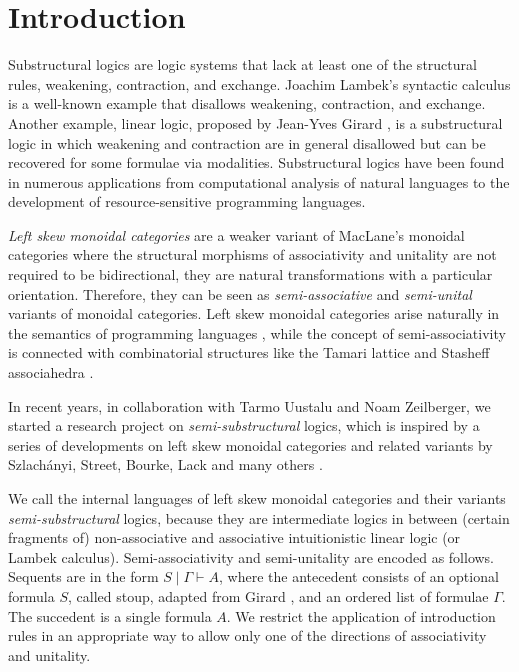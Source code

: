 \documentclass[sn-mathphys-num]{sn-jnl}%
\theoremstyle{thmstyleone}%
\theoremstyle{thmstyletwo}%
\theoremstyle{thmstylethree}%
\begin{document}
\section{Introduction}\label{sec:intro}
Substructural logics are logic systems that lack at least one of the structural rules, weakening, contraction, and exchange.
Joachim Lambek's syntactic calculus \cite{lambek:mathematics:58} is a well-known example that disallows weakening, contraction, and exchange.
Another example, linear logic, proposed by Jean-Yves Girard \cite{girard:linear:87}, is a substructural logic in which weakening and contraction are in general disallowed but can be recovered for some formulae via modalities.
Substructural logics have been found in numerous applications from computational analysis of natural languages to the development of resource-sensitive programming languages.

\emph{Left skew monoidal categories} \cite{szlachanyi:skew-monoidal:2012} are a weaker variant of MacLane's monoidal categories where the structural morphisms of associativity and unitality are not required to be bidirectional, they are natural transformations with a particular orientation.
Therefore, they can be seen as \emph{semi-associative} and \emph{semi-unital} variants of monoidal categories. 
Left skew monoidal categories arise naturally in the semantics of programming languages \cite{altenkirch:monads:2014}, while the concept of semi-associativity is connected with combinatorial structures like the Tamari lattice and Stasheff associahedra \cite{zeilberger:semiassociative:19}.

In recent years, in collaboration with Tarmo Uustalu and Noam Zeilberger, we started a research project on \emph{semi-substructural} logics, which is inspired by a series of developments on left skew monoidal categories and related variants by Szlach{\'a}nyi, Street, Bourke, Lack and many others \cite{szlachanyi:skew-monoidal:2012,street:skew-closed:2013,lack:triangulations:2014,bourke:skew:2018,bourke:lack:braided:2020}.

We call the internal languages of left skew monoidal categories and their variants \emph{semi-substructural} logics, because they are intermediate logics in between (certain fragments of) non-associative and associative intuitionistic linear logic (or Lambek calculus).
Semi-associativity and semi-unitality are encoded as follows.
Sequents are in the form $S \mid \Gamma \vdash A$, where the antecedent consists of an optional formula $S$, called stoup, adapted from Girard \cite{girard:constructive:91}, and an ordered list of formulae $\Gamma$.
The succedent is a single formula $A$.
We restrict the application of introduction rules in an appropriate way to allow only one of the directions of associativity and unitality.
\end{document}
